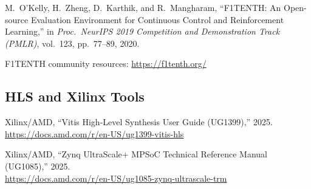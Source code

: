 \documentclass[12pt,a4paper]{article}
\begin{document}
\begin{enumerate}[resume, label={[\arabic*]}]
    \item M.~O'Kelly, H.~Zheng, D.~Karthik, and R.~Mangharam, ``F1TENTH: An Open-source Evaluation Environment for Continuous Control and Reinforcement Learning,'' in \textit{Proc.\ NeurIPS 2019 Competition and Demonstration Track (PMLR)}, vol.~123, pp.~77--89, 2020.

    \item F1TENTH community resources: \url{https://f1tenth.org/}
\end{enumerate}

\subsection{HLS and Xilinx Tools}

\begin{enumerate}[resume, label={[\arabic*]}]
    \item Xilinx/AMD, ``Vitis High-Level Synthesis User Guide (UG1399),'' 2025.\\
    \url{https://docs.amd.com/r/en-US/ug1399-vitis-hls}

    \item Xilinx/AMD, ``Zynq UltraScale+ MPSoC Technical Reference Manual (UG1085),'' 2025.\\
    \url{https://docs.amd.com/r/en-US/ug1085-zynq-ultrascale-trm}
\end{enumerate}
\end{document}

